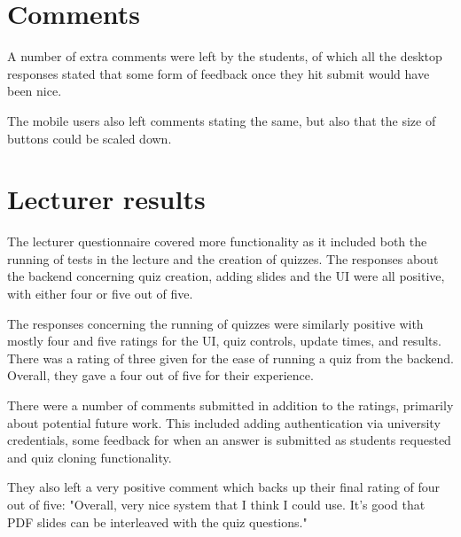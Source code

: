 \section{Comments} 
A number of extra comments were left by the students, of which all the desktop responses stated that some form of feedback once they hit submit would have been nice.

The mobile users also left comments stating the same, but also that the size of buttons could be scaled down.

\section{Lecturer results}
The lecturer questionnaire covered more functionality as it included both the running of tests in the lecture and the creation of quizzes. The responses about the backend concerning quiz creation, adding slides and the UI were all positive, with either four or five out of five.

The responses concerning the running of quizzes were similarly positive with mostly four and five ratings for the UI, quiz controls, update times, and results. There was a rating of three given for the ease of running a quiz from the backend. Overall, they gave a four out of five for their experience.

There were a number of comments submitted in addition to the ratings, primarily about potential future work. This included adding authentication via university credentials, some feedback for when an answer is submitted as students requested and quiz cloning functionality. 

They also left a very positive comment which backs up their final rating of four out of five: "Overall, very nice system that I think I could use. It's good that PDF slides can be interleaved with the quiz questions."